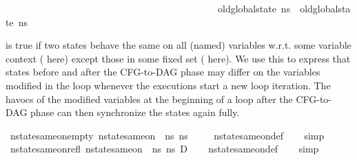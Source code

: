 \begin{isabellebody}
\ \ \ \ \ \ \ \ \ \ \ \ \ \ \ \ \ \ \ \ \ \ \ \ \ \ \ \ \ \ \ \ \ \ \ \ \ \ \ \ \ \ \ \ old{\isacharunderscore}{\kern0pt}global{\isacharunderscore}{\kern0pt}state\ ns{}\ {\isacharequal}{\kern0pt}\ old{\isacharunderscore}{\kern0pt}global{\isacharunderscore}{\kern0pt}state\ ns{}{\isacharparenright}{\kern0pt}{\isachardoublequoteclose}%
\begin{isamarkuptext}%
 is true if two states behave the same on all (named) variables w.r.t. some
variable context (\isa{\isafree{{\isasymLambda}}} here) except those in some fixed set ( here). We use this to express
that states before and after the CFG-to-DAG phase may differ on the variables modified in the loop 
whenever the executions start a new loop iteration. The havocs of the modified variables at the 
beginning of a loop after the CFG-to-DAG phase can then synchronize the states again fully.%
\end{isamarkuptext}\isamarkuptrue%
\isamarkupfalse%
\ nstate{\isacharunderscore}{\kern0pt}same{\isacharunderscore}{\kern0pt}on{\isacharunderscore}{\kern0pt}empty{\isacharcolon}{\kern0pt}\ {\isachardoublequoteopen}nstate{\isacharunderscore}{\kern0pt}same{\isacharunderscore}{\kern0pt}on\ {\isasymLambda}\ ns{}\ ns{}\ {\isacharbraceleft}{\kern0pt}{\isacharbraceright}{\kern0pt}{\isachardoublequoteclose}\isanewline
%
\isadelimproof
\ \ %
\endisadelimproof
%
\isatagproof
{}\isamarkupfalse%
\ nstate{\isacharunderscore}{\kern0pt}same{\isacharunderscore}{\kern0pt}on{\isacharunderscore}{\kern0pt}def\isanewline
\ \ \isamarkupfalse%
\ simp%
\endisatagproof
{\isafoldproof}%
%
\isadelimproof
\isanewline
%
\endisadelimproof
\isanewline
{}\isamarkupfalse%
\ nstate{\isacharunderscore}{\kern0pt}same{\isacharunderscore}{\kern0pt}on{\isacharunderscore}{\kern0pt}refl{\isacharcolon}{\kern0pt}\ {\isachardoublequoteopen}nstate{\isacharunderscore}{\kern0pt}same{\isacharunderscore}{\kern0pt}on\ {\isasymLambda}\ ns\ ns\ D{\isachardoublequoteclose}\isanewline
%
\isadelimproof
\ \ %
\endisadelimproof
%
\isatagproof
{}\isamarkupfalse%
\ nstate{\isacharunderscore}{\kern0pt}same{\isacharunderscore}{\kern0pt}on{\isacharunderscore}{\kern0pt}def\isanewline
\ \ \isamarkupfalse%
\ simp%
\endisatagproof
{\isafoldproof}%
%
\isadelimproof
\isanewline
%
\endisadelimproof
\isanewline
{}\isamarkupfalse%

\end{isabellebody}
